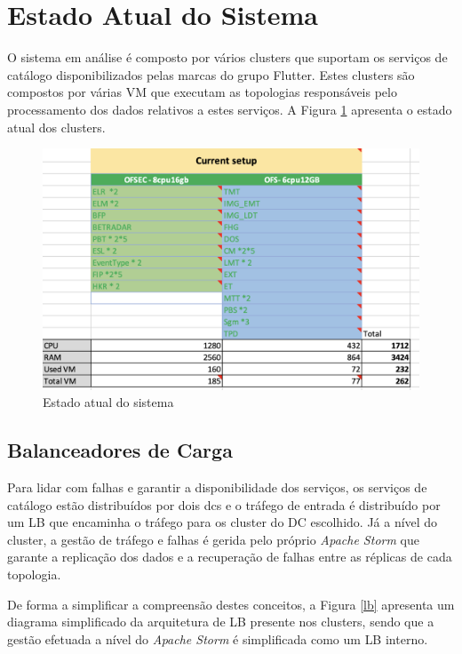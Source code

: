 \section{Estado Atual do Sistema}

O sistema em análise é composto por vários \glspl{cluster} que suportam os serviços de catálogo
disponibilizados pelas marcas do grupo Flutter. Estes \glspl{cluster} são compostos por várias
\ac{VM} que executam as topologias responsáveis pelo processamento dos dados relativos a estes
serviços. A Figura \ref{strat-current} apresenta o estado atual dos \glspl{cluster}.

\begin{figure}[H]
  \centerline{\includegraphics[scale=0.5]{media/content/analise/strat-current.png}}
  \caption{Estado atual do sistema}
  \label{strat-current}
\end{figure}

\subsection{Balanceadores de Carga}

Para lidar com falhas e garantir a disponibilidade dos serviços, os serviços de catálogo estão
distribuídos por dois \glspl{dc} e o tráfego de entrada é distribuído por um \ac{LB} que encaminha
o tráfego para os \gls{cluster} do \ac{DC} escolhido. Já a nível do \gls{cluster}, a gestão de 
tráfego e falhas é gerida pelo próprio \textit{Apache Storm} que garante a replicação dos dados
e a recuperação de falhas entre as réplicas de cada topologia.

De forma a simplificar a compreensão destes conceitos, a Figura \ref{lb} apresenta um diagrama
simplificado da arquitetura de \ac{LB} presente nos \glspl{cluster}, sendo que a gestão efetuada
a nível do \textit{Apache Storm} é simplificada como um \ac{LB} interno.

